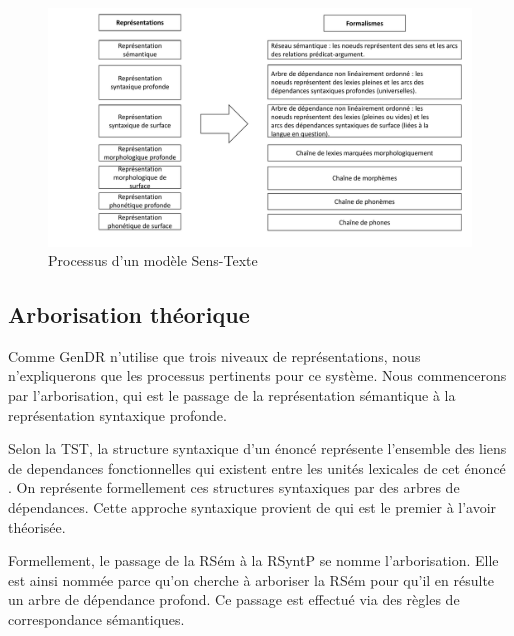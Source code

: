 \begin{figure}[htb]
	\centering
	\includegraphics[width=1\textwidth, trim = {0cm 0cm 0cm 0cm},clip]{ch3/figs/polguere2.pdf}
	\caption{Processus d'un modèle Sens-Texte \citep{PolgueretheorieSensTexte1998}}
	\label{fig:processustst}
\end{figure}


\subsection{Arborisation théorique}\label{arbo}


Comme GenDR n'utilise que trois niveaux de représentations, nous n'expliquerons que les processus pertinents pour ce système. Nous commencerons par l'arborisation, qui est le passage de la représentation sémantique à la représentation syntaxique profonde.

Selon la \ac{TST}, la structure syntaxique d'un énoncé représente l'ensemble des liens de dependances fonctionnelles qui existent entre les unités lexicales de cet énoncé \citep{melcuk1988}. On représente formellement ces structures syntaxiques par des arbres de dépendances. Cette approche syntaxique provient de \cite{TesniereElementssyntaxestructurale1965} qui est le premier à l'avoir théorisée.

Formellement, le passage de la RSém  à la RSyntP se nomme l'arborisation. Elle est ainsi nommée  parce qu'on cherche à arboriser la RSém pour qu'il en résulte un arbre de dépendance profond. Ce passage est effectué via des règles de correspondance sémantiques.

